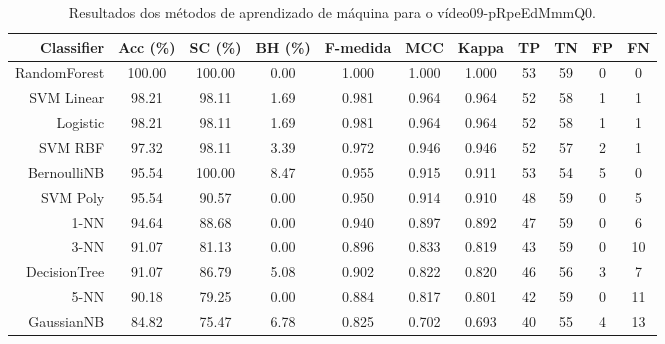 \begin{table}[!htb]
\centering
\caption{Resultados dos métodos de aprendizado de máquina para o vídeo09-pRpeEdMmmQ0.}
\label{tab:09-pRpeEdMmmQ0}
\begin{tabular}{r|c|c|c|c|c|c|c|c|c|c}
\hline\hline
Classifier & Acc (\%) & SC (\%) & BH (\%) & F-medida & MCC & Kappa & TP & TN & FP & FN \\ \hline
RandomForest & 100.00 & 100.00 & 0.00 & 1.000 & 1.000 & 1.000 & 53 & 59 & 0 & 0 \\ 
SVM Linear & 98.21 & 98.11 & 1.69 & 0.981 & 0.964 & 0.964 & 52 & 58 & 1 & 1 \\ 
Logistic & 98.21 & 98.11 & 1.69 & 0.981 & 0.964 & 0.964 & 52 & 58 & 1 & 1 \\ 
SVM RBF & 97.32 & 98.11 & 3.39 & 0.972 & 0.946 & 0.946 & 52 & 57 & 2 & 1 \\ 
BernoulliNB & 95.54 & 100.00 & 8.47 & 0.955 & 0.915 & 0.911 & 53 & 54 & 5 & 0 \\ 
SVM Poly & 95.54 & 90.57 & 0.00 & 0.950 & 0.914 & 0.910 & 48 & 59 & 0 & 5 \\ 
1-NN & 94.64 & 88.68 & 0.00 & 0.940 & 0.897 & 0.892 & 47 & 59 & 0 & 6 \\ 
3-NN & 91.07 & 81.13 & 0.00 & 0.896 & 0.833 & 0.819 & 43 & 59 & 0 & 10 \\ 
DecisionTree & 91.07 & 86.79 & 5.08 & 0.902 & 0.822 & 0.820 & 46 & 56 & 3 & 7 \\ 
5-NN & 90.18 & 79.25 & 0.00 & 0.884 & 0.817 & 0.801 & 42 & 59 & 0 & 11 \\ 
GaussianNB & 84.82 & 75.47 & 6.78 & 0.825 & 0.702 & 0.693 & 40 & 55 & 4 & 13 \\ 
\hline\hline
\end{tabular}
\end{table}
